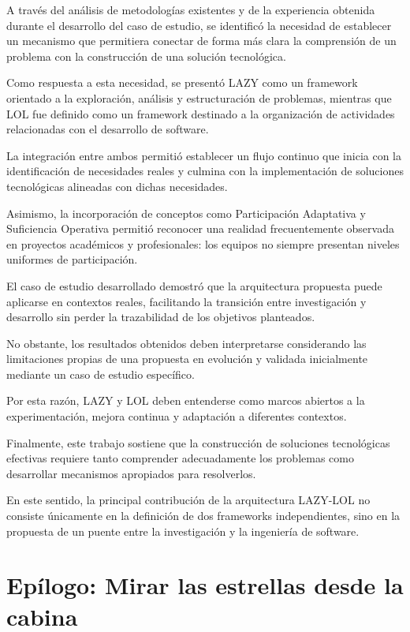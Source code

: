 \documentclass[14pt,a4paper,oneside]{extbook}
\begin{document}
A través del análisis de metodologías existentes y de la experiencia obtenida durante el desarrollo del caso de estudio, se identificó la necesidad de establecer un mecanismo que permitiera conectar de forma más clara la comprensión de un problema con la construcción de una solución tecnológica.

Como respuesta a esta necesidad, se presentó LAZY como un framework orientado a la exploración, análisis y estructuración de problemas, mientras que LOL fue definido como un framework destinado a la organización de actividades relacionadas con el desarrollo de software.

La integración entre ambos permitió establecer un flujo continuo que inicia con la identificación de necesidades reales y culmina con la implementación de soluciones tecnológicas alineadas con dichas necesidades.

Asimismo, la incorporación de conceptos como Participación Adaptativa y Suficiencia Operativa permitió reconocer una realidad frecuentemente observada en proyectos académicos y profesionales: los equipos no siempre presentan niveles uniformes de participación.

El caso de estudio desarrollado demostró que la arquitectura propuesta puede aplicarse en contextos reales, facilitando la transición entre investigación y desarrollo sin perder la trazabilidad de los objetivos planteados.

No obstante, los resultados obtenidos deben interpretarse considerando las limitaciones propias de una propuesta en evolución y validada inicialmente mediante un caso de estudio específico.

Por esta razón, LAZY y LOL deben entenderse como marcos abiertos a la experimentación, mejora continua y adaptación a diferentes contextos.

Finalmente, este trabajo sostiene que la construcción de soluciones tecnológicas efectivas requiere tanto comprender adecuadamente los problemas como desarrollar mecanismos apropiados para resolverlos.

En este sentido, la principal contribución de la arquitectura LAZY-LOL no consiste únicamente en la definición de dos frameworks independientes, sino en la propuesta de un puente entre la investigación y la ingeniería de software.



\chapter*{Epílogo: Mirar las estrellas desde la cabina}
\end{document}
